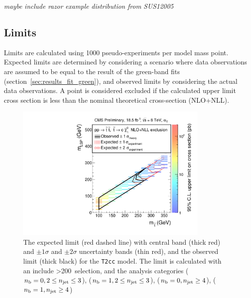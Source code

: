 \emph{maybe include razor example distribution from SUS12005}

\subsection{Limits}
Limits are calculated using 1000 pseudo-experiments per model mass point.
Expected limits are determined by considering a scenario where data observations
are assumed to be equal to the result of the green-band fits
(section~\ref{sec:results_fit_green}), and observed
limits by considering the actual data observations.
A point is considered excluded if the calculated upper limit cross section is
less than the nominal theoretical cross-section (NLO+NLL).

\begin{figure}[h!]
\centering
\includegraphics[width=0.85\textwidth]{Figs/sms/t2cc/limit_v0/T2cc_toys_XSEC.pdf}
\caption{The expected limit (red dashed line) with central band (thick red)
and $\pm1\sigma$ and $\pm2\sigma$ uncertainty bands (thin red), and the
observed limit (thick black) for the \texttt{T2cc} model. The limit is
calculated with an include \HT>200~\gev selection, and the analysis categories 
($n_{\text{b}} = 0, 2\leq n_{\text{jet}}\leq3$), ($n_{\text{b}} = 1, 2\leq n_{\text{jet}}\leq3$), ($n_{\text{b}} = 0, n_{\text{jet}} \geq 4$), ($n_{\text{b}} = 1,
n_{\text{jet}} \geq 4$)}
\label {fig:t2cc_limit}
\end{figure}

